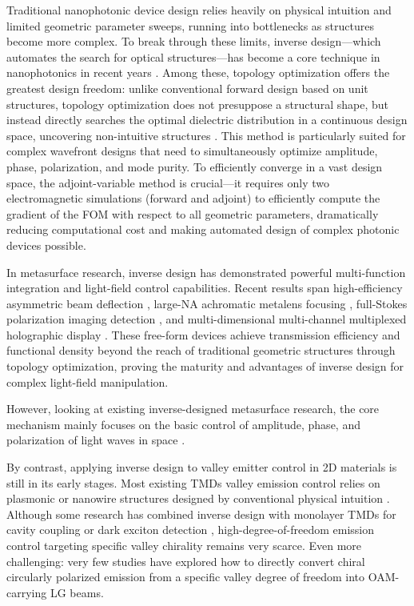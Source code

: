 Traditional nanophotonic device design relies heavily on physical intuition and limited geometric parameter sweeps, running into bottlenecks as structures become more complex. To break through these limits, inverse design—which automates the search for optical structures—has become a core technique in nanophotonics in recent years \cite{jensen2011topology, molesky2018inverse}. Among these, topology optimization offers the greatest design freedom: unlike conventional forward design based on unit structures, topology optimization does not presuppose a structural shape, but instead directly searches the optimal dielectric distribution in a continuous design space, uncovering non-intuitive structures \cite{jensen2011topology}. This method is particularly suited for complex wavefront designs that need to simultaneously optimize amplitude, phase, polarization, and mode purity. To efficiently converge in a vast design space, the adjoint-variable method is crucial—it requires only two electromagnetic simulations (forward and adjoint) to efficiently compute the gradient of the FOM with respect to all geometric parameters, dramatically reducing computational cost and making automated design of complex photonic devices possible.

In metasurface research, inverse design has demonstrated powerful multi-function integration and light-field control capabilities. Recent results span high-efficiency asymmetric beam deflection \cite{li2022empowering}, large-NA achromatic metalens focusing \cite{choi2025roll}, full-Stokes polarization imaging detection \cite{wang2024non}, and multi-dimensional multi-channel multiplexed holographic display \cite{yin2024multi}. These free-form devices achieve transmission efficiency and functional density beyond the reach of traditional geometric structures through topology optimization, proving the maturity and advantages of inverse design for complex light-field manipulation.

However, looking at existing inverse-designed metasurface research, the core mechanism mainly focuses on the basic control of amplitude, phase, and polarization of light waves in space \cite{molesky2018inverse, li2022empowering}.

By contrast, applying inverse design to valley emitter control in 2D materials is still in its early stages. Most existing TMDs valley emission control relies on plasmonic or nanowire structures designed by conventional physical intuition \cite{mak2012control, deng2021plasmonic}. Although some research has combined inverse design with monolayer TMDs for cavity coupling or dark exciton detection \cite{gelly2023inverse}, high-degree-of-freedom emission control targeting specific valley chirality remains very scarce. Even more challenging: very few studies have explored how to directly convert chiral circularly polarized emission from a specific valley degree of freedom into OAM-carrying LG beams.

